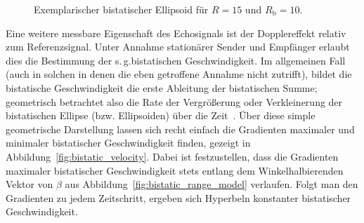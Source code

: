 \begin{figure}[htb]
    \centering
    \caption{Exemplarischer bistatischer Ellipsoid für \(R = 15\) und \(R_\text{b} = 10\).}\label{fig:bistatic_ellipsoid}
\end{figure}

Eine weitere messbare Eigenschaft des Echosignals ist der Dopplereffekt relativ zum Referenzsignal. Unter Annahme stationärer Sender und Empfänger erlaubt dies die Bestimmung der s.\,g.\@ bistatischen Geschwindigkeit. Im allgemeinen Fall (auch in solchen in denen die eben getroffene Annahme nicht zutrifft), bildet die bistatische Geschwindigkeit die erste Ableitung der bistatischen Summe; geometrisch betrachtet also die Rate der Vergrößerung oder Verkleinerung der bistatischen Ellipse (bzw. Ellipsoiden) über die Zeit~\cite[S.~119]{Willis2005}. Über diese simple geometrische Darstellung lassen sich recht einfach die Gradienten maximaler und minimaler bistatischer Geschwindigkeit finden, gezeigt in Abbildung~\ref{fig:bistatic_velocity}. Dabei ist festzustellen, dass die Gradienten maximaler bistatischer Geschwindigkeit stets entlang dem Winkelhalbierenden Vektor von \(\beta \) aus Abbildung~\ref{fig:bistatic_range_model} verlaufen. Folgt man den Gradienten zu jedem Zeitschritt, ergeben sich Hyperbeln konstanter bistatischer Geschwindigkeit.

